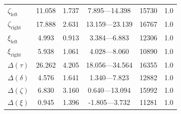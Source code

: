 \documentclass[doc,biblatex]{apa7}
\begin{document}
\begin{table}
\begin{center}
\begin{threeparttable}
\begin{tabular}{lccccc}
$\zeta_\mathrm{left}$   &  11.058 & 1.737 &   7.895---14.398  & 15730 & 1.0 \\
$\zeta_\mathrm{right}$  &  17.888 & 2.631 &  13.159---23.139  & 16767 & 1.0 \\
$\xi_\mathrm{left}$     &   4.993 & 0.913 &   3.384---6.883   & 12306 & 1.0 \\
$\xi_\mathrm{right}$    &   5.938 & 1.061 &   4.028---8.060   & 10890 & 1.0 \\
$\Delta(\tau)$          &  26.262 & 4.205 &  18.056---34.564  & 16355 & 1.0 \\
$\Delta(\delta)$        &   4.576 & 1.641 &   1.340---7.823   & 12882 & 1.0 \\
$\Delta(\zeta)$         &   6.830 & 3.160 &   0.640---13.094  & 15992 & 1.0 \\
$\Delta(\xi)$           &   0.945 & 1.396 &  -1.805---3.732   & 11281 & 1.0 \\
\bottomrule
\end{tabular}
\label{supptable3}
\end{threeparttable}
\end{center}
\end{table}
\end{document}
